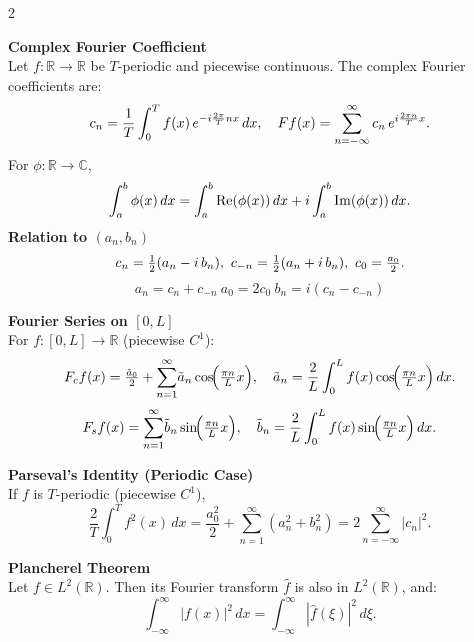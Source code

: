 \documentclass[8pt]{article}
\begin{document}
\begin{multicols}{2}
	\columnbreak

	\noindent \textbf{Complex Fourier Coefficient}\\
	Let \( f : \mathbb{R} \to \mathbb{R} \) be \( T \)-periodic and piecewise continuous.  The complex Fourier coefficients are:
	\[
		c_n = \frac{1}{T} \int_0^T f(x)\, e^{-i \frac{2\pi}{T} n x} \, dx,
		\quad
		Ff(x) = \sum_{n=-\infty}^{\infty} c_{n}\,e^{i\frac{2\pi n}{T}x}.\vspace{-10px}
	\]
	For \( \phi : \mathbb{R} \to \mathbb{C} \), \vspace{-5px}
	\[ \int_a^b \phi(x)\,dx
		= \int_a^b \operatorname{Re}(\phi(x)) \, dx + i \int_a^b \operatorname{Im}(\phi(x)) \, dx. \vspace{-5px}
	\]
	\noindent \textbf{Relation to \( (a_n, b_n) \)}\quad
	\[ \vspace{-5px}
		c_{n} = \tfrac{1}{2}(a_{n} - i\,b_{n}),\
		c_{-n} = \tfrac{1}{2}(a_{n} + i\,b_{n}),\
		c_{0} = \tfrac{a_{0}}{2}.\]\[
		a_{n} = c_n + c_{-n}\
		a_{0} = 2 c_0 \
		b_n = i(c_n - c_{-n})
	\]

	\noindent \textbf{Fourier Series on $[0,L]$}\\
	For $f:[0,L]\to \mathbb{R}$ (piecewise $C^1$):
	\[
		F_{c}f(x)=\tfrac{\tilde a_{0}}{2} + \sum_{n=1}^{\infty}\!\tilde a_{n}\cos\!\Bigl(\tfrac{\pi n}{L}x\Bigr),
		\quad \tilde a_{n}=\frac{2}{L}\int_{0}^{L} f(x)\cos\!\Bigl(\tfrac{\pi n}{L}x\Bigr)\,dx.
	\]
	\[
		F_{s}f(x)=\sum_{n=1}^{\infty}\!\tilde b_{n}\sin\!\Bigl(\tfrac{\pi n}{L}x\Bigr),
		\quad \tilde b_{n}=\frac{2}{L}\int_{0}^{L} f(x)\sin\!\Bigl(\tfrac{\pi n}{L}x\Bigr)\,dx.
	\]

	\noindent \textbf{Parseval's Identity (Periodic Case)}\\
	If $f$ is $T$-periodic (piecewise $C^1$),
	\[
		\frac{2}{T}\int_{0}^{T} f^{2}(x)\,dx
		= \frac{a_{0}^{2}}{2} + \sum_{n=1}^{\infty}(a_{n}^{2}+b_{n}^{2})
		= 2\sum_{n=-\infty}^{\infty}\!\!\bigl|c_{n}\bigr|^{2}.
	\]

	\noindent \textbf{Plancherel Theorem}\\
	Let $f \in L^2(\mathbb{R})$. Then its Fourier transform $\hat{f}$ is also in $L^2(\mathbb{R})$, and:
	\[
		\int_{-\infty}^\infty |f(x)|^2 \, dx
		= \int_{-\infty}^\infty |\hat{f}(\xi)|^2 \, d\xi.
	\]


\end{multicols}
\end{document}
